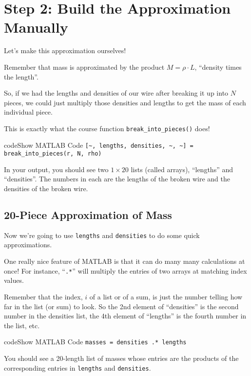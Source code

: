 \documentclass{ximera}
\begin{document}
\section*{Step 2: Build the Approximation Manually}

Let's make this approximation ourselves!

Remember that mass is approximated by the product $M = \rho \cdot L$, ``density times the length''.

So, if we had the lengths and densities of our wire after breaking it up into $N$ pieces, we could just multiply those densities and lengths to get the mass of each individual piece.

This is exactly what the course function \texttt{break\_into\_pieces()} does!

\begin{expandable}{code}{Show MATLAB Code}
\texttt{[\textasciitilde, lengths, densities, \textasciitilde, \textasciitilde] = break\_into\_pieces(r, N, rho)}
\end{expandable}

In your output, you should see two $1\times20$ lists (called arrays), ``lengths'' and ``densities''. The numbers in each are the lengths of the broken wire and the densities of the broken wire.

\subsection*{20-Piece Approximation of Mass}

Now we're going to use \texttt{lengths} and \texttt{densities} to do some quick approximations.

One really nice feature of MATLAB is that it can do many many calculations at once! For instance, ``\texttt{.*}'' will multiply the entries of two arrays at matching index values.

\begin{remark}
Remember that the index, $i$ of a list or of a sum, is just the number telling how far in the list (or sum) to look. So the 2nd element of ``densities'' is the second number in the densities list, the 4th element of ``lengths'' is the fourth number in the list, etc.
\end{remark}

\begin{expandable}{code}{Show MATLAB Code}
\texttt{masses = densities .* lengths}
\end{expandable}

You should see a 20-length list of masses whose entries are the products of the corresponding entries in \texttt{lengths} and \texttt{densities}.
\end{document}
